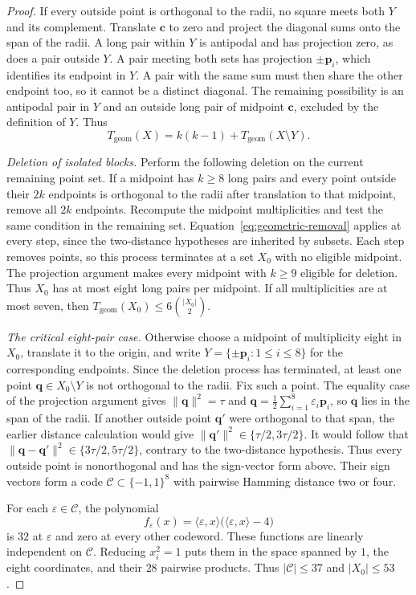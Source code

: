 \documentclass[11pt,a4paper]{article}
\newif\ifshowrevisions
\newenvironment{revision}{\par\begingroup\ifshowrevisions\color{red}\fi}{\par\endgroup}
\theoremstyle{definition}
\numberwithin{equation}{section}
\begin{document}
\begin{proof}
If every outside point is orthogonal to the radii, no square meets both $Y$ and its complement. Translate $\mathbf c$ to zero and project the diagonal sums onto the span of the radii. A long pair within $Y$ is antipodal and has projection zero, as does a pair outside $Y$. A pair meeting both sets has projection $\pm\mathbf p_i$, which identifies its endpoint in $Y$. A pair with the same sum must then share the other endpoint too, so it cannot be a distinct diagonal. The remaining possibility is an antipodal pair in $Y$ and an outside long pair of midpoint $\mathbf c$, excluded by the definition of $Y$. Thus
\begin{equation}\label{eq:geometric-removal}
T_{\mathrm{geom}}(X)=k(k-1)+T_{\mathrm{geom}}(X\setminus Y).
\end{equation}
\begin{revision}
\noindent\emph{Deletion of isolated blocks.} Perform the following deletion on the current remaining point set. If a midpoint has $k\ge8$ long pairs and every point outside their $2k$ endpoints is orthogonal to the radii after translation to that midpoint, remove all $2k$ endpoints. Recompute the midpoint multiplicities and test the same condition in the remaining set. Equation~\eqref{eq:geometric-removal} applies at every step, since the two-distance hypotheses are inherited by subsets. Each step removes points, so this process terminates at a set $X_0$ with no eligible midpoint. The projection argument makes every midpoint with $k\ge9$ eligible for deletion. Thus $X_0$ has at most eight long pairs per midpoint. If all multiplicities are at most seven, then $T_{\mathrm{geom}}(X_0)\le6\binom{|X_0|}{2}$.
\end{revision}

\begin{revision}
\noindent\emph{The critical eight-pair case.} Otherwise choose a midpoint of multiplicity eight in $X_0$, translate it to the origin, and write $Y=\{\pm\mathbf p_i:1\le i\le8\}$ for the corresponding endpoints. Since the deletion process has terminated, at least one point $\mathbf q\in X_0\setminus Y$ is not orthogonal to the radii. Fix such a point. The equality case of the projection argument gives $\|\mathbf q\|^2=\tau$ and $\mathbf q=\tfrac12\sum_{i=1}^8\varepsilon_i\mathbf p_i$, so $\mathbf q$ lies in the span of the radii. If another outside point $\mathbf q'$ were orthogonal to that span, the earlier distance calculation would give $\|\mathbf q'\|^2\in\{\tau/2,3\tau/2\}$. It would follow that $\|\mathbf q-\mathbf q'\|^2\in\{3\tau/2,5\tau/2\}$, contrary to the two-distance hypothesis. Thus every outside point is nonorthogonal and has the sign-vector form above. Their sign vectors form a code $\mathcal C\subset\{-1,1\}^8$ with pairwise Hamming distance two or four.
\end{revision} For each $\varepsilon\in\mathcal C$, the polynomial
\[
f_{\varepsilon}(x)=\langle\varepsilon,x\rangle\bigl(\langle\varepsilon,x\rangle-4\bigr)
\]
is $32$ at $\varepsilon$ and zero at every other codeword. These functions are linearly independent on $\mathcal C$. Reducing $x_i^2=1$ puts them in the space spanned by $1$, the eight coordinates, and their $28$ pairwise products. Thus $|\mathcal C|\le37$ and $|X_0|\le53$.


\end{proof}
\end{document}
